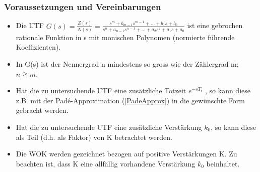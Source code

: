 \subsubsection{Voraussetzungen und Vereinbarungen }
\begin{itemize}
\item  Die UTF $G(s)=\frac{Z(s)}{N(s)}=\frac{s^m + b_{m-1}s^{m-1}+ ... + b_{1}s+b_{0}}{s^{n}+a_{n-1}s^{n-1} + ... + a_{2}s^{2}+a_{1}s + a_{0}}$
ist eine gebrochen rationale
Funktion in s mit monischen Polynomen (normierte führende Koeffizienten).
\item  In G(s) ist der Nennergrad n mindestens so gross wie der Zählergrad m; $n \geqq m$.
\item  Hat die zu untersuchende UTF eine zusätzliche Totzeit $e^{-sT_t}$ , so kann diese
z.B. mit der Padé-Approximation (\ref{PadeApprox}) in die gewünschte Form gebracht werden.
\item  Hat die zu untersuchende UTF eine zusätzliche Verstärkung $k_0$, so kann diese
als Teil (d.h. als Faktor) von K betrachtet werden.
\item  Die WOK werden gezeichnet bezogen auf positive Verstärkungen K. Zu beachten
ist, dass K eine allfällig vorhandene Verstärkung $k_0$ beinhaltet.
\end{itemize}

\clearpage
